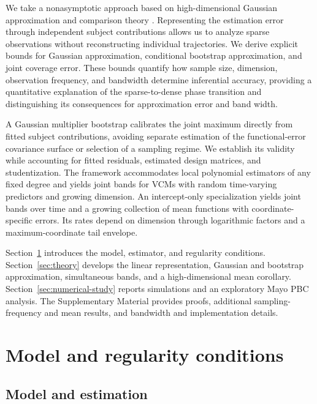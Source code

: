 \documentclass[12pt]{article}
\numberwithin{equation}{section}
\begin{document}
We take a nonasymptotic approach based on high-dimensional Gaussian approximation and comparison theory \citep{chernozhukov_central_2017,chernozhukov_et_al_2022}. Representing the estimation error through independent subject contributions allows us to analyze sparse observations without reconstructing individual trajectories. We derive explicit bounds for Gaussian approximation, conditional bootstrap approximation, and joint coverage error. These bounds quantify how sample size, dimension, observation frequency, and bandwidth determine inferential accuracy, providing a quantitative explanation of the sparse-to-dense phase transition and distinguishing its consequences for approximation error and band width.

A Gaussian multiplier bootstrap calibrates the joint maximum directly from fitted subject contributions, avoiding separate estimation of the functional-error covariance surface or selection of a sampling regime. We establish its validity while accounting for fitted residuals, estimated design matrices, and studentization. The framework accommodates local polynomial estimators of any fixed degree and yields joint bands for VCMs with random time-varying predictors and growing dimension. An intercept-only specialization yields joint bands over time and a growing collection of mean functions with coordinate-specific errors. Its rates depend on dimension through logarithmic factors and a maximum-coordinate tail envelope.

Section~\ref{sec:method} introduces the model, estimator, and regularity conditions. Section~\ref{sec:theory} develops the linear representation, Gaussian and bootstrap approximation, simultaneous bands, and a high-dimensional mean corollary. Section~\ref{sec:numerical-study} reports simulations and an exploratory Mayo PBC analysis. The Supplementary Material provides proofs, additional sampling-frequency and mean results, and bandwidth and implementation details.

\section{Model and regularity conditions}\label{sec:method}

\subsection{Model and estimation}\label{sec:model}\label{sec:estimation}
\end{document}
